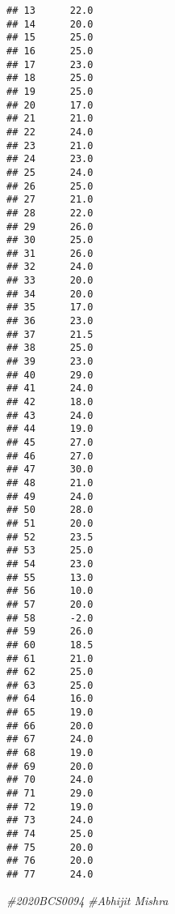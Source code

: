 \documentclass[
]{article}
\newenvironment{Shaded}{\begin{snugshade}}{\end{snugshade}}
\newcommand{\CommentTok}[1]{\textcolor[rgb]{0.56,0.35,0.01}{\textit{#1}}}
\begin{document}
\begin{verbatim}
## 13      22.0
## 14      20.0
## 15      25.0
## 16      25.0
## 17      23.0
## 18      25.0
## 19      25.0
## 20      17.0
## 21      21.0
## 22      24.0
## 23      21.0
## 24      23.0
## 25      24.0
## 26      25.0
## 27      21.0
## 28      22.0
## 29      26.0
## 30      25.0
## 31      26.0
## 32      24.0
## 33      20.0
## 34      20.0
## 35      17.0
## 36      23.0
## 37      21.5
## 38      25.0
## 39      23.0
## 40      29.0
## 41      24.0
## 42      18.0
## 43      24.0
## 44      19.0
## 45      27.0
## 46      27.0
## 47      30.0
## 48      21.0
## 49      24.0
## 50      28.0
## 51      20.0
## 52      23.5
## 53      25.0
## 54      23.0
## 55      13.0
## 56      10.0
## 57      20.0
## 58      -2.0
## 59      26.0
## 60      18.5
## 61      21.0
## 62      25.0
## 63      25.0
## 64      16.0
## 65      19.0
## 66      20.0
## 67      24.0
## 68      19.0
## 69      20.0
## 70      24.0
## 71      29.0
## 72      19.0
## 73      24.0
## 74      25.0
## 75      20.0
## 76      20.0
## 77      24.0
\end{verbatim}

\begin{Shaded}
\begin{Highlighting}[]
\CommentTok{\#2020BCS0094}
\CommentTok{\#Abhijit Mishra}
\end{Highlighting}
\end{Shaded}
\end{document}
